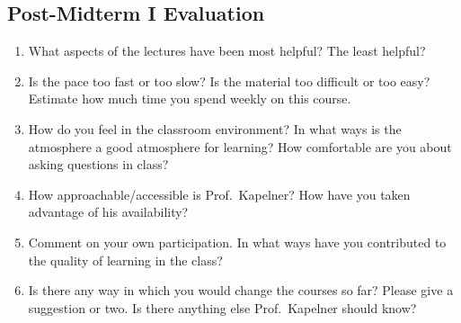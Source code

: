 \documentclass[12pt]{article}
\begin{document}
\thispagestyle{empty}
\begin{center}
\section*{Post-Midterm I Evaluation}
\end{center}

\begin{enumerate}
\item What aspects of the lectures have been most helpful?  The least helpful?
\vfill
\vfill

\item Is the pace too fast or too slow?  Is the material too difficult or too easy?  Estimate how much time you spend weekly on this course.
\vfill
\vfill

\item How do you feel in the classroom environment?  In what ways is the atmosphere a good atmosphere for learning?  How comfortable are you about asking questions in class?
\vfill
\vfill

\item How approachable/accessible is Prof.\ Kapelner?  How have you taken advantage of his availability?
\vfill
\vfill

\item Comment on your own participation.  In what ways have you contributed to the quality of learning in the class?
\vfill
\vfill


\item Is there any way in which you would change the courses so far?  Please give a suggestion or two.  Is there anything else Prof.\ Kapelner should know?
\vfill
\vfill

\end{enumerate}
\end{document}
